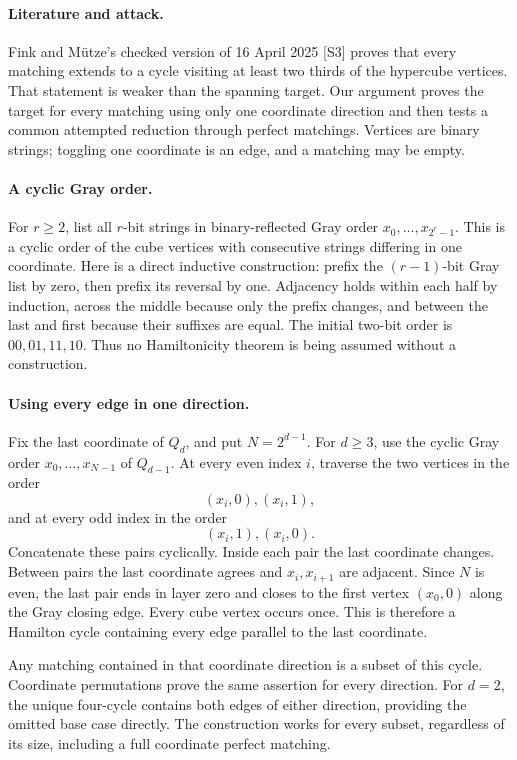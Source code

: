 \documentclass[11pt,a4paper]{article}
\begin{document}
\paragraph{Literature and attack.}
Fink and M\"utze's checked version of 16 April 2025 [S3] proves that every matching extends to a cycle visiting at least two thirds of the hypercube vertices. That statement is weaker than the spanning target. Our argument proves the target for every matching using only one coordinate direction and then tests a common attempted reduction through perfect matchings. Vertices are binary strings; toggling one coordinate is an edge, and a matching may be empty.

\paragraph{A cyclic Gray order.}
For $r\ge2$, list all $r$-bit strings in binary-reflected Gray order $x_0,\ldots,x_{2^r-1}$. This is a cyclic order of the cube vertices with consecutive strings differing in one coordinate. Here is a direct inductive construction: prefix the $(r-1)$-bit Gray list by zero, then prefix its reversal by one. Adjacency holds within each half by induction, across the middle because only the prefix changes, and between the last and first because their suffixes are equal. The initial two-bit order is $00,01,11,10$. Thus no Hamiltonicity theorem is being assumed without a construction.

\paragraph{Using every edge in one direction.}
Fix the last coordinate of $Q_d$, and put $N=2^{d-1}$. For $d\ge3$, use the cyclic Gray order $x_0,\ldots,x_{N-1}$ of $Q_{d-1}$. At every even index $i$, traverse the two vertices in the order
\[
 (x_i,0),(x_i,1),
\]
and at every odd index in the order
\[
 (x_i,1),(x_i,0).
\]
Concatenate these pairs cyclically. Inside each pair the last coordinate changes. Between pairs the last coordinate agrees and $x_i,x_{i+1}$ are adjacent. Since $N$ is even, the last pair ends in layer zero and closes to the first vertex $(x_0,0)$ along the Gray closing edge. Every cube vertex occurs once. This is therefore a Hamilton cycle containing every edge parallel to the last coordinate.

Any matching contained in that coordinate direction is a subset of this cycle. Coordinate permutations prove the same assertion for every direction. For $d=2$, the unique four-cycle contains both edges of either direction, providing the omitted base case directly. The construction works for every subset, regardless of its size, including a full coordinate perfect matching.
\end{document}
